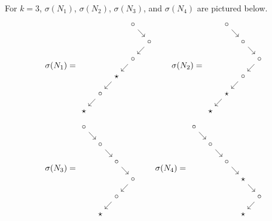 \documentclass[main.tex]{subfiles}
\begin{document}
\begin{example}
  For $k = 3$, $\sigma(N_{1})$, $\sigma(N_{2})$, $\sigma(N_{3})$, and $\sigma(N_{4})$ are pictured below.
  \begin{equation*}
    \sigma(N_{1}) = 
    \begin{tikzcd}[column sep=tiny, row sep=small]
      &&& \circ
      \arrow[dr]
      \\
      &&&& \circ
      \arrow[dl]
      \\
      &&& \circ
      \arrow[dl]
      \\
      && \star 
      \arrow[dl]
      \\
      & \circ
      \arrow[dl]
      \\
      \star
    \end{tikzcd}
    \qquad \sigma(N_{2}) =
    \begin{tikzcd}[column sep=tiny, row sep=small]
      & \circ
      \arrow[dr]
      \\
      && \circ
      \arrow[dr]
      \\
      &&& \circ
      \arrow[dl]
      \\
      && \circ 
      \arrow[dl]
      \\
      & \star
      \arrow[dl]
      \\
      \star
    \end{tikzcd}
  \end{equation*}
  \begin{equation*}
    \sigma(N_{3}) = 
    \begin{tikzcd}[column sep=tiny, row sep=small]
      \circ
      \arrow[dr]
      \\
      & \circ
      \arrow[dr]
      \\
      && \circ
      \arrow[dr]
      \\
      &&& \circ 
      \arrow[dl]
      \\
      && \circ
      \arrow[dl]
      \\
      & \star
    \end{tikzcd}
    \qquad \sigma(N_{4}) =
    \begin{tikzcd}[column sep=tiny, row sep=small]
      \circ
      \arrow[dr]
      \\
      & \circ
      \arrow[dr]
      \\
      && \circ
      \arrow[dr]
      \\
      &&& \star 
      \arrow[dr]
      \\
      &&&& \circ
      \arrow[dl]
      \\
      &&& \star
    \end{tikzcd}
  \end{equation*}
\end{example}
\end{document}
